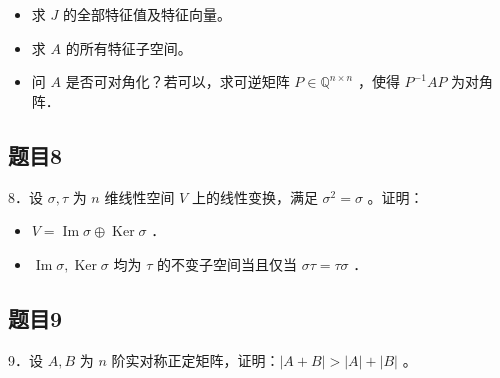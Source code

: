 \documentclass{article}
\begin{document}
\begin{itemize}
  \item[（1）] 求 \(J\) 的全部特征值及特征向量。
  \item[（2）] 求 \(A\) 的所有特征子空间。
  \item[（3）] 问 \(A\) 是否可对角化？若可以，求可逆矩阵 \(P \in \mathbb{Q}^{n \times n}\) ，使得 \(P^{-1} A P\) 为对角阵．
\end{itemize}

\subsection{题目8}
8．设 \(\sigma, \tau\) 为 \(n\) 维线性空间 \(V\) 上的线性变换，满足 \(\sigma^{2}=\sigma\) 。证明：

\begin{itemize}
  \item[（1）] \(V=\operatorname{Im} \sigma \oplus \operatorname{Ker} \sigma\) ．
  \item[（2）] \(\operatorname{Im} \sigma, \operatorname{Ker} \sigma\) 均为 \(\tau\) 的不变子空间当且仅当 \(\sigma \tau=\tau \sigma\) ．
\end{itemize}

\subsection{题目9}
9．设 \(A, B\) 为 \(n\) 阶实对称正定矩阵，证明：\(|A+B|>|A|+|B|\) 。
\end{document}
